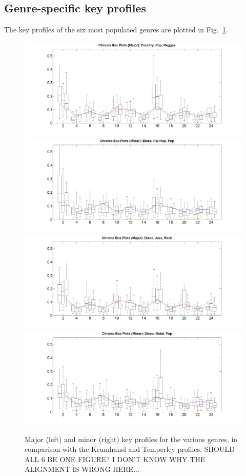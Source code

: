 \documentclass{article}
\begin{document}
\subsection{Genre-specific key profiles}
The key profiles of the six most populated genres are plotted in Fig.~\ref{fig:SpecificKeyProfiles}.
\begin{figure}[tb]
    \includegraphics[scale=.2]{graph/boxPlotsMajCPR+Krum+Temp}
    \includegraphics[scale=.2]{graph/boxPlotsMinBHP+Krum+Temp}
    \includegraphics[scale=.2]{graph/boxPlotsMajDJRk+Krum+Temp}
    \includegraphics[scale=.2]{graph/boxPlotsMinDMR+Krum+Temp}
	\caption{Major (left) and minor (right) key profiles for the various genres, in comparison with the Krumhansl and Temperley profiles. SHOULD ALL 6 BE ONE FIGURE? I DON'T KNOW WHY THE ALIGNMENT IS WRONG HERE...}
	\label{fig:SpecificKeyProfiles}
\end{figure}
\end{document}
